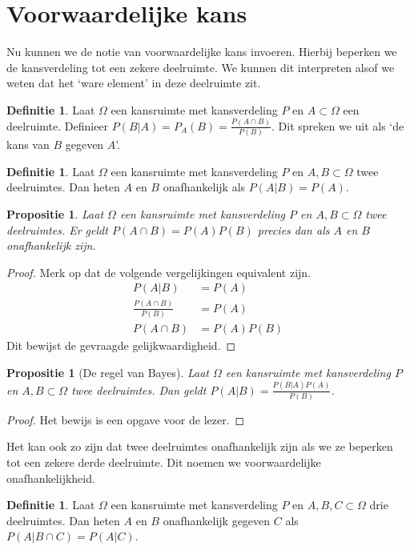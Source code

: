 \documentclass[a4paper]{report}
\newtheorem{proposition}[theorem]{Propositie}
\theoremstyle{definition}
\newtheorem{definition}[theorem]{Definitie}
\begin{document}
\section{Voorwaardelijke kans}
Nu kunnen we de notie van voorwaardelijke kans invoeren.
Hierbij beperken we de kansverdeling tot een zekere deelruimte.
We kunnen dit interpreten alsof we weten dat het `ware element' in deze deelruimte zit.
\begin{definition}
    Laat $\Omega$ een kansruimte met kansverdeling $P$ en $A \subset \Omega$ een deelruimte.
    Definieer $P(B|A) = P_A(B) = \frac{P(A \cap B)}{P(B)}$. Dit spreken we uit als `de kans van $B$ gegeven $A$'.
\end{definition}

\begin{definition}
    Laat $\Omega$ een kansruimte met kansverdeling $P$ en $A,B \subset \Omega$ twee deelruimtes.
    Dan heten $A$ en $B$ onafhankelijk als $P(A|B) = P(A)$.
\end{definition}

\begin{proposition}
    Laat $\Omega$ een kansruimte met kansverdeling $P$ en $A,B \subset \Omega$ twee deelruimtes.
    Er geldt $P(A \cap B) = P(A)P(B)$ precies dan als $A$ en $B$ onafhankelijk zijn.
\end{proposition}
\begin{proof}
    Merk op dat de volgende vergelijkingen equivalent zijn.
    \begin{align*}
        P(A|B)                      &= P(A) \\
        \frac{P(A \cap B)}{P(B)}    &= P(A) \\
        P(A \cap B)                 &= P(A)P(B)
    \end{align*}
    Dit bewijst de gevraagde gelijkwaardigheid.
\end{proof}

\begin{proposition}[De regel van Bayes]
    Laat $\Omega$ een kansruimte met kansverdeling $P$ en $A,B \subset \Omega$ twee deelruimtes.
    Dan geldt $P(A|B) = \frac{P(B|A)P(A)}{P(B)}$.
\end{proposition}
\begin{proof}
    Het bewijs is een opgave voor de lezer.
\end{proof}

Het kan ook zo zijn dat twee deelruimtes onafhankelijk zijn als we ze beperken tot een zekere derde deelruimte.
Dit noemen we voorwaardelijke onafhankelijkheid.
\begin{definition}
    Laat $\Omega$ een kansruimte met kansverdeling $P$ en $A,B,C \subset \Omega$ drie deelruimtes.
    Dan heten $A$ en $B$ onafhankelijk gegeven $C$ als $P(A|B \cap C) = P(A|C)$.
\end{definition}
\end{document}
